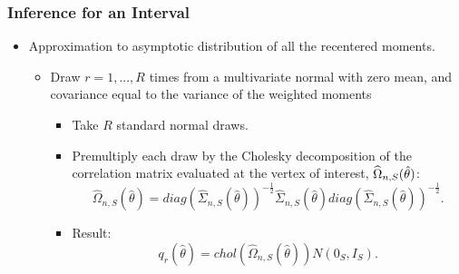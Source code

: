 \documentclass[10pt,letterpaper]{beamer}
\begin{document}

\begin{frame}
\frametitle{Inference for an Interval}

\begin{itemize}
\item Approximation to asymptotic distribution of all the recentered
moments. 

\begin{itemize}
\item Draw $r=1,...,R$ times from a multivariate normal with zero mean, and 
covariance equal to the variance of the weighted moments 

\begin{itemize}
\item Take $R$ standard normal draws. 

\item Premultiply each draw by the Cholesky decomposition of the correlation
matrix evaluated at the vertex of interest, $\widehat{\Omega}_{n,S}(\hat{%
\theta})$:  
\begin{equation*}
\widehat{\Omega }_{n,S}(\hat{\theta})=diag(\widehat{\Sigma}_{n,S}(\hat{\theta%
}))^{-\frac{1}{2}}\widehat{\Sigma}_{n,S}(\hat{\theta})diag(\widehat{\Sigma}%
_{n,S}(\hat{\theta}))^{-\frac{1}{2}}.
\end{equation*}

\item Result:  
\begin{equation*}
q_{r}(\hat{\theta})=chol(\widehat{\Omega}_{n,S}(\hat{\theta}))N(0_{S},I_{S}).
\end{equation*}
\end{itemize}
\end{itemize}
\end{itemize}
\end{frame}

\end{document}
